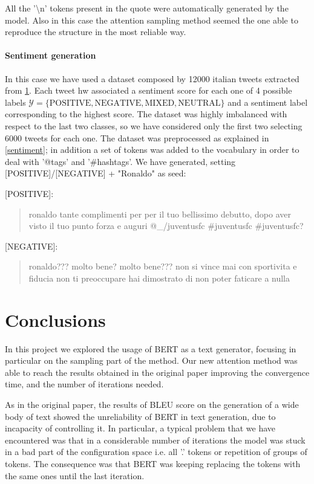 \documentclass[10pt,twocolumn,letterpaper]{article}
\begin{document}
All the '\textbackslash n' tokens present in the quote were automatically generated by the model.
Also in this case the attention sampling method seemed the one able to reproduce the structure in the most reliable way.


\paragraph{Sentiment generation} In this case we have used a dataset
composed by 12000 italian tweets extracted from \ref{}.
Each tweet hw associated a sentiment score for each one of 4 possible labels
$\mathcal Y = \{\text{POSITIVE}, \text{NEGATIVE}, \text{MIXED}, \text{NEUTRAL}\}$
and a sentiment label corresponding to the highest score.
The dataset was highly imbalanced with respect to the last two classes, so we have considered only the first two
selecting 6000 tweets for each one.
The dataset was preprocessed as explained in \ref{sentiment}; in addition a set of tokens was added to the vocabulary
in order to deal with '@tags' and '#hashtags'. We have generated, setting [POSITIVE]/[NEGATIVE] + "Ronaldo"
as seed:

[POSITIVE]:
\begin{quote}
   ronaldo tante complimenti per per il tuo bellissimo debutto, dopo aver visto il tuo punto forza e auguri @\_/juventusfc #juventusfc #juventusfc?
\end{quote}

[NEGATIVE]:
\begin{quote}
   ronaldo??? molto bene? molto bene??? non si vince mai con sportivita e fiducia non ti preoccupare hai dimostrato di non poter faticare a nulla
\end{quote}


\section{Conclusions}
In this project we explored the usage of BERT as a text generator,
focusing in particular on the sampling part of the method.
Our new attention method was able to reach the results obtained in the original paper
improving the convergence time, and the number of iterations needed.

As in the original paper, the results of BLEU score on the generation of a wide body of text
showed the unreliability of BERT in text generation,
due to incapacity of controlling it.
In particular, a typical problem that we have encountered was that in
a considerable number of iterations the model was stuck in a bad part of the
configuration space i.e. all '.' tokens or repetition of groups of tokens.
The consequence was that BERT was keeping replacing the tokens with the same ones
until the last iteration.
\end{document}
